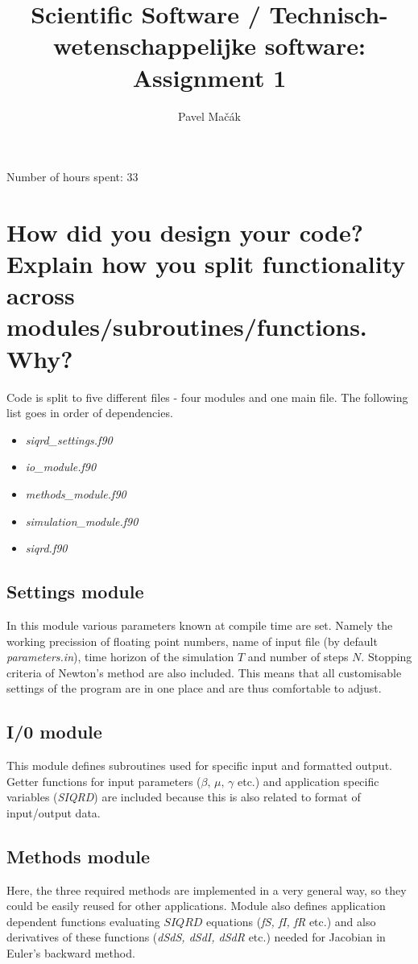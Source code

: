 \documentclass[a4paper]{article}
\title{Scientific Software / Technisch-wetenschappelijke software: Assignment 1}
\author{Pavel Mačák}
\begin{document}
\maketitle

Number of hours spent: 33

\section{How did you design your code? Explain how you split functionality across modules/subroutines/functions. Why?}
Code is split to five different files - four modules and one main file. The following list goes in order of dependencies.

\begin{itemize}
	\item \textit{siqrd\_settings.f90}
	\item \textit{io\_module.f90}
	\item \textit{methods\_module.f90}
	\item \textit{simulation\_module.f90}
	\item \textit{siqrd.f90}
\end{itemize}

\subsection{Settings module}
	In this module various parameters known at compile time are set. Namely the working precission of floating point numbers, name of input file (by default \textit{parameters.in}), time horizon of the simulation $ T $ and number of steps $ N $. Stopping criteria of Newton's method are also included. This means that all customisable settings of the program are in one place and are thus comfortable to adjust.
	
\subsection{I/0 module}
	This module defines subroutines used for specific input and formatted output. Getter functions for input parameters ($ \beta,\,\mu,\,\gamma $ etc.) and application specific variables (\textit{SIQRD}) are included because this is also related to format of input/output data.
	
\subsection{Methods module}
	Here, the three required methods are implemented in a very general way, so they could be easily reused for other applications. Module also defines application dependent functions evaluating $ SIQRD $ equations (\textit{fS, fI, fR} etc.) and also derivatives of these functions (\textit{dSdS, dSdI, dSdR} etc.) needed for Jacobian in Euler's backward method.
	
\end{document}
